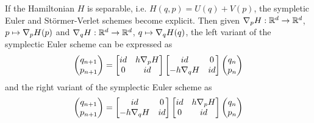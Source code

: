 \documentclass[twoside,a4paper]{article}
\begin{document}
If the Hamiltonian $H$ is separable, i.e. $H(q,p) = U(q) + V(p)$, the sympletic Euler and Störmer-Verlet
schemes become explicit. Then given $\grad[p]{H} : \mathbb{R}^d \to \mathbb{R}^d$, $p \mapsto \grad[p]{H}(p)$ 
and $\grad[q]{H} : \mathbb{R}^d \to \mathbb{R}^d$, $q \mapsto \grad[q]{H}(q)$,
the left variant of the symplectic Euler scheme can be expressed as
\begin{equation*}
	\begin{pmatrix}
		q_{n+1} \\
		p_{n+1}
	\end{pmatrix} =
	\begin{bmatrix}
		id & h \grad[p]{H} \\
		0 & id
	\end{bmatrix} \begin{bmatrix}
		id & 0 \\
		-h \grad[q]{H} & id
	\end{bmatrix}
	\begin{pmatrix}
		q_{n} \\
		p_{n}
	\end{pmatrix} 
\end{equation*}
and the right variant of the symplectic Euler scheme as
\begin{equation*}
	\begin{pmatrix}
		q_{n+1} \\
		p_{n+1}
	\end{pmatrix} =
	\begin{bmatrix}
		id & 0 \\
		-h \grad[q]{H} & id
	\end{bmatrix}
	\begin{bmatrix}
		id & h \grad[p]{H} \\
		0 & id
	\end{bmatrix}
	\begin{pmatrix}
		q_{n} \\
		p_{n}
	\end{pmatrix}
\end{equation*}
\end{document}
